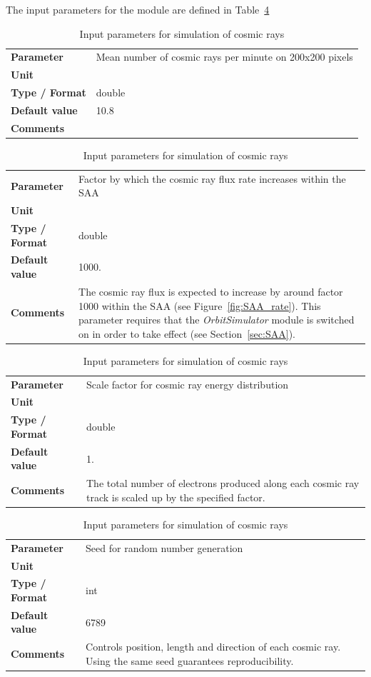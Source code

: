 \documentclass[11pt]{article}      %
\def\HCode#1{}
\def\htmlanchor#1{\HCode{<a id="#1"></a>}}
\begin{document}
The input parameters for the module are defined in Table~\ref{tab:cosmics}

\begin{table}[hb]
  \caption{Input parameters for simulation of cosmic rays}

  \htmlanchor{meanCosmicsPerMinute}
  \begin{tabular}{| l | p{13cm} |}
    \hline 
    {\bf Parameter} & Mean number of cosmic rays per minute on 200x200 pixels\\
    {\bf Unit} & \\
    {\bf Type / Format} & double\\
    {\bf Default value} & 10.8\\
    {\bf Comments} & \\
    \hline
  \end{tabular}
  \bigskip

  \htmlanchor{SAAFluxFactor}
  \begin{tabular}{| l | p{13cm} |}
    \hline 
    {\bf Parameter} & Factor by which the cosmic ray flux rate increases within the SAA\\
    {\bf Unit} & \\
    {\bf Type / Format} & double\\
    {\bf Default value} & 1000.\\
    {\bf Comments} & The cosmic ray flux is expected to increase by around factor 1000 within the SAA (see Figure~\ref{fig:SAA_rate}). This parameter requires that the {\it OrbitSimulator} module is switched on in order to take effect (see Section~\ref{sec:SAA}).\\
    \hline
  \end{tabular}
  \bigskip

  \htmlanchor{cosmicEnergyScaleFactor}
  \begin{tabular}{| l | p{13cm} |}
    \hline 
    {\bf Parameter} & Scale factor for cosmic ray energy distribution\\
    {\bf Unit} & \\
    {\bf Type / Format} & double\\
    {\bf Default value} & 1.\\
    {\bf Comments} & The total number of electrons produced along each cosmic ray track is scaled up by the specified factor.\\
    \hline
  \end{tabular}
  \bigskip

  \htmlanchor{cosmicSeed}
  \begin{tabular}{| l | p{13cm} |}
    \hline 
    {\bf Parameter} & Seed for random number generation\\
    {\bf Unit} & \\
    {\bf Type / Format} & int\\
    {\bf Default value} & 6789\\
    {\bf Comments} & Controls position, length and direction of each cosmic ray. Using the same seed guarantees reproducibility.\\
    \hline
  \end{tabular}
  \bigskip

  \label{tab:cosmics}
\end{table}
\end{document}
